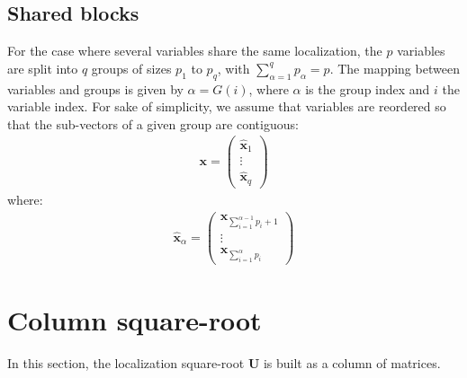 \documentclass[12pt]{scrartcl}
\begin{document}
\subsection{Shared blocks}
For the case where several variables share the same localization, the $p$ variables are split into $q$ groups of sizes $p_1$ to $p_q$, with $\displaystyle \sum_{\alpha=1}^q p_\alpha = p$. The mapping between variables and groups is given by $\alpha = G(i)$, where $\alpha$ is the group index and $i$ the variable index. For sake of simplicity, we assume that variables are reordered so that the sub-vectors of a given group are contiguous:
\begin{align}
\mathbf{x} = \left( \begin{array}{c}
\widehat{\mathbf{x}}_1 \\[1ex]
\hline
\vdots \\
\hline
\widehat{\mathbf{x}}_{q}
\end{array} \right)
\end{align}
where:
\begin{align}
\widehat{\mathbf{x}}_\alpha = \left( \begin{array}{c}
\mathbf{x}_{\sum_{i=1}^{\alpha-1} p_i+1} \\[1ex]
\hline
\vdots \\
\hline
\mathbf{x}_{\sum_{i=1}^\alpha p_i}
\end{array} \right)
\end{align}

\section{Column square-root}
In this section, the localization square-root $\mathbf{U}$ is built as a column of matrices.
\end{document}
